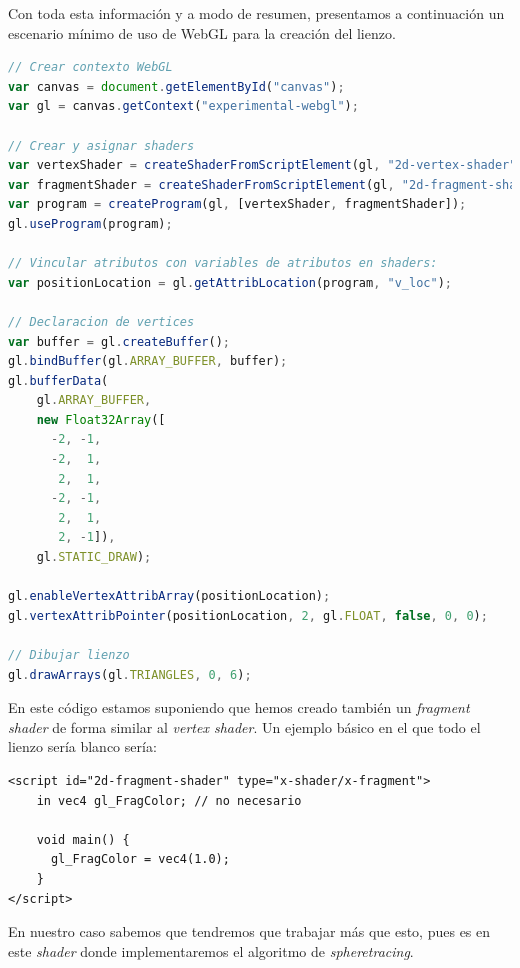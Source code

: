 Con toda esta información y a modo de resumen, presentamos a continuación un escenario mínimo de uso de WebGL para la creación del lienzo. 
\begin{lstlisting}[language=JavaScript]
// Crear contexto WebGL
var canvas = document.getElementById("canvas");
var gl = canvas.getContext("experimental-webgl");

// Crear y asignar shaders
var vertexShader = createShaderFromScriptElement(gl, "2d-vertex-shader");
var fragmentShader = createShaderFromScriptElement(gl, "2d-fragment-shader");
var program = createProgram(gl, [vertexShader, fragmentShader]);
gl.useProgram(program);

// Vincular atributos con variables de atributos en shaders: 
var positionLocation = gl.getAttribLocation(program, "v_loc");

// Declaracion de vertices
var buffer = gl.createBuffer();
gl.bindBuffer(gl.ARRAY_BUFFER, buffer);
gl.bufferData(
    gl.ARRAY_BUFFER,
    new Float32Array([
      -2, -1,
      -2,  1,
       2,  1,
      -2, -1,
       2,  1,
       2, -1]),
    gl.STATIC_DRAW);
    
gl.enableVertexAttribArray(positionLocation);
gl.vertexAttribPointer(positionLocation, 2, gl.FLOAT, false, 0, 0);

// Dibujar lienzo
gl.drawArrays(gl.TRIANGLES, 0, 6);
\end{lstlisting}
En este código estamos suponiendo que hemos creado también un \textit{fragment shader} de forma similar al \textit{vertex shader}. Un ejemplo básico en el que todo el lienzo sería blanco sería:
\begin{lstlisting}
<script id="2d-fragment-shader" type="x-shader/x-fragment">
    in vec4 gl_FragColor; // no necesario
    
    void main() {
      gl_FragColor = vec4(1.0);
    }
</script>
\end{lstlisting}
En nuestro caso sabemos que tendremos que trabajar más que esto, pues es en este \textit{shader} donde implementaremos el algoritmo de \textit{spheretracing}.\newline


